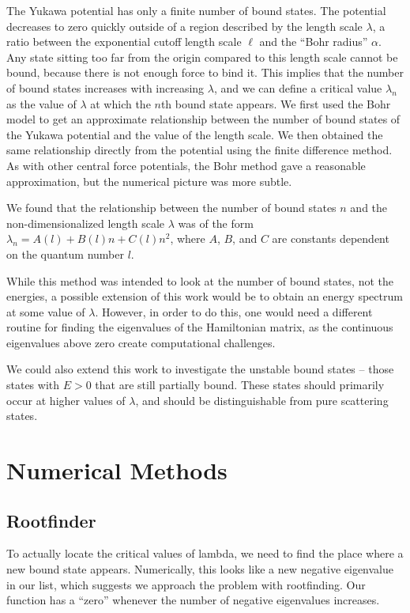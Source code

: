 \documentclass[12pt,twoside]{reedthesis}
\begin{document}
The Yukawa potential has only a finite number of bound states. The potential decreases to zero quickly outside of a region described by the length scale $\lambda$, a ratio between the exponential cutoff length scale $\ell$ and the ``Bohr radius'' $\alpha$. Any state sitting too far from the origin compared to this length scale cannot be bound, because there is not enough force to bind it. This implies that the number of bound states increases with increasing $\lambda$, and we can define a critical value $\lambda_n$ as the value of $\lambda$ at which the $n$th bound state appears.
We first used the Bohr model to get an approximate relationship between the number of bound states of the Yukawa potential and the value of the length scale. We then obtained the same relationship directly from the potential using the finite difference method. As with other central force potentials, the Bohr method gave a reasonable approximation, but the numerical picture was more subtle. 

We found that the relationship between the number of bound states $n$ and the non-dimensionalized length scale $\lambda$ was of the form $\lambda_n = A(l) + B(l)n + C(l)n^2$, where $A$, $B$, and $C$ are constants dependent on the quantum number $l$. 

While this method was intended to look at the number of bound states, not the energies, a possible extension of this work would be to obtain an energy spectrum at some value of $\lambda$. However, in order to do this, one would need a different routine for finding the eigenvalues of the Hamiltonian matrix, as the continuous eigenvalues above zero create computational challenges.

We could also extend this work to investigate the unstable bound states -- those states with $E > 0$ that are still partially bound. These states should primarily occur at higher values of $\lambda$, and should be distinguishable from pure scattering states. 


%
\appendix
\chapter{Numerical Methods}

\section{Rootfinder}

To actually locate the critical values of lambda, we need to find the place where a new bound state appears. Numerically, this looks like a new negative eigenvalue in our list, which suggests we approach the problem with rootfinding. Our function has a ``zero'' whenever the number of negative eigenvalues increases.
\end{document}
